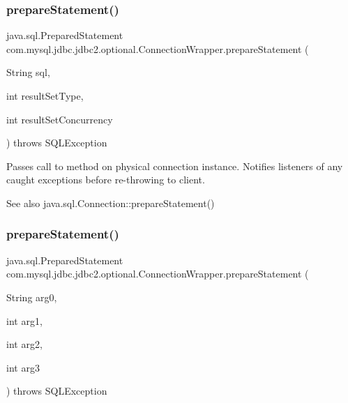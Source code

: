 \subsubsection{\texorpdfstring{prepare\+Statement()}{prepareStatement()}\hspace{0.1cm}{\footnotesize\ttfamily [2/6]}}
{\footnotesize\ttfamily java.\+sql.\+Prepared\+Statement com.\+mysql.\+jdbc.\+jdbc2.\+optional.\+Connection\+Wrapper.\+prepare\+Statement (\begin{DoxyParamCaption}\item[{String}]{sql,  }\item[{int}]{result\+Set\+Type,  }\item[{int}]{result\+Set\+Concurrency }\end{DoxyParamCaption}) throws S\+Q\+L\+Exception}

Passes call to method on physical connection instance. Notifies listeners of any caught exceptions before re-\/throwing to client.

\begin{DoxySeeAlso}{See also}
java.\+sql.\+Connection\+::prepare\+Statement() 
\end{DoxySeeAlso}
\mbox{\label{classcom_1_1mysql_1_1jdbc_1_1jdbc2_1_1optional_1_1_connection_wrapper_a661a65ea718a5d69493ea70ae86f1635}} 
\subsubsection{\texorpdfstring{prepare\+Statement()}{prepareStatement()}\hspace{0.1cm}{\footnotesize\ttfamily [3/6]}}
{\footnotesize\ttfamily java.\+sql.\+Prepared\+Statement com.\+mysql.\+jdbc.\+jdbc2.\+optional.\+Connection\+Wrapper.\+prepare\+Statement (\begin{DoxyParamCaption}\item[{String}]{arg0,  }\item[{int}]{arg1,  }\item[{int}]{arg2,  }\item[{int}]{arg3 }\end{DoxyParamCaption}) throws S\+Q\+L\+Exception}

